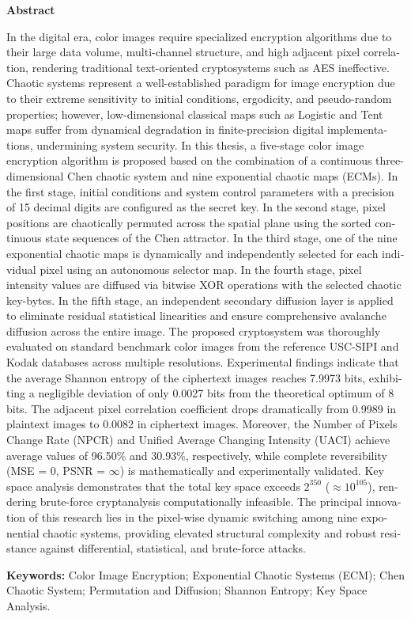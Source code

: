 \begin{latin}
\begin{center}
    {\Large \textbf{Abstract}}
\end{center}
\vspace{0.5cm}

In the digital era, color images require specialized encryption algorithms due to their large data volume, multi-channel structure, and high adjacent pixel correlation, rendering traditional text-oriented cryptosystems such as AES ineffective. Chaotic systems represent a well-established paradigm for image encryption due to their extreme sensitivity to initial conditions, ergodicity, and pseudo-random properties; however, low-dimensional classical maps such as Logistic and Tent maps suffer from dynamical degradation in finite-precision digital implementations, undermining system security. In this thesis, a five-stage color image encryption algorithm is proposed based on the combination of a continuous three-dimensional Chen chaotic system and nine exponential chaotic maps (ECMs). In the first stage, initial conditions and system control parameters with a precision of 15 decimal digits are configured as the secret key. In the second stage, pixel positions are chaotically permuted across the spatial plane using the sorted continuous state sequences of the Chen attractor. In the third stage, one of the nine exponential chaotic maps is dynamically and independently selected for each individual pixel using an autonomous selector map. In the fourth stage, pixel intensity values are diffused via bitwise XOR operations with the selected chaotic key-bytes. In the fifth stage, an independent secondary diffusion layer is applied to eliminate residual statistical linearities and ensure comprehensive avalanche diffusion across the entire image. The proposed cryptosystem was thoroughly evaluated on standard benchmark color images from the reference USC-SIPI and Kodak databases across multiple resolutions. Experimental findings indicate that the average Shannon entropy of the ciphertext images reaches 7.9973 bits, exhibiting a negligible deviation of only 0.0027 bits from the theoretical optimum of 8 bits. The adjacent pixel correlation coefficient drops dramatically from 0.9989 in plaintext images to 0.0082 in ciphertext images. Moreover, the Number of Pixels Change Rate (NPCR) and Unified Average Changing Intensity (UACI) achieve average values of 96.50\% and 30.93\%, respectively, while complete reversibility (MSE = 0, PSNR = $\infty$) is mathematically and experimentally validated. Key space analysis demonstrates that the total key space exceeds $2^{350}$ ($\approx 10^{105}$), rendering brute-force cryptanalysis computationally infeasible. The principal innovation of this research lies in the pixel-wise dynamic switching among nine exponential chaotic systems, providing elevated structural complexity and robust resistance against differential, statistical, and brute-force attacks.

\vspace{0.8cm}
\textbf{Keywords:} Color Image Encryption; Exponential Chaotic Systems (ECM); Chen Chaotic System; Permutation and Diffusion; Shannon Entropy; Key Space Analysis.
\end{latin}
\newpage
